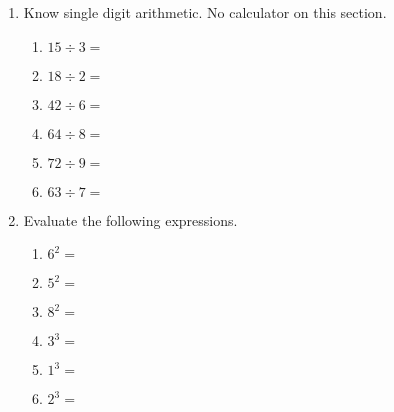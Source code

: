 \documentclass[12pt, twoside]{article}
\begin{document}
\begin{enumerate}
    \item Know single digit arithmetic. No calculator on this section.
    \begin{multicols}{2}
    \begin{enumerate}[itemsep=0.5cm]
        \item $15 \div 3 =$
        \item $18 \div 2 =$
        \item $42 \div 6 =$
        \item $64 \div 8 =$
        \item $72 \div 9 =$
        \item $63 \div 7 =$
    \end{enumerate}
    \end{multicols}

    \item Evaluate the following expressions.
        \begin{multicols}{2}
        \begin{enumerate}[itemsep=0.5cm]
            \item $6^2=$
            \item $5^2=$
            \item $8^2=$
            \item $3^3=$
            \item $1^3=$
            \item $2^3=$
        \end{enumerate}
        \end{multicols}

\end{enumerate}
\end{document}
